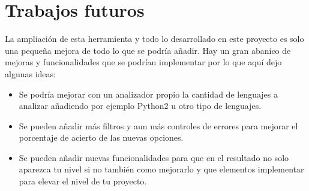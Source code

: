 \documentclass[a4paper, 12pt]{book}
\begin{document}
\section{Trabajos futuros}
\label{sec:trabajos_futuros}

La ampliación de esta herramienta y todo lo desarrollado en este proyecto es solo una pequeña mejora de todo lo que se podría añadir. Hay un gran abanico de mejoras y funcionalidades que se podrían implementar por lo que aquí dejo algunas ideas:

\begin{itemize}
	\item Se podría mejorar con un analizador propio la cantidad de lenguajes a analizar añadiendo por ejemplo Python2 u otro tipo de lenguajes.
	\item Se pueden añadir más filtros y aun más controles de errores para mejorar el porcentaje de acierto de las nuevas opciones.
	\item Se pueden añadir nuevas funcionalidades para que en el resultado no solo aparezca tu nivel si no también como mejorarlo y que elementos implementar para elevar el nivel de tu proyecto.
\end{itemize}






\cleardoublepage


\end{document}
